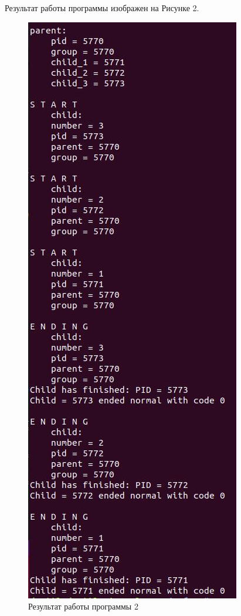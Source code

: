 \documentclass[14pt, a4paper]{extarticle}
\begin{document}
	\clearpage
	Результат работы программы изображен на Рисунке 2.
	\begin{figure}[h!]
		\centering
		\includegraphics[scale=1]{source/2}
		\caption{Результат работы программы 2}
	\end{figure}
\end{document}
